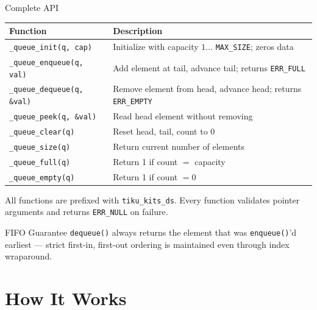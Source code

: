 \documentclass[aspectratio=169, 10pt]{beamer}
\begin{document}
\begin{frame}[fragile]{Complete API}
\begin{table}
\centering
\small
\begin{tabular}{@{}lp{8cm}@{}}
\toprule
\textbf{Function} & \textbf{Description} \\
\midrule
\texttt{\_queue\_init(q, cap)}
  & Initialize with capacity $1 \ldots$ \texttt{MAX\_SIZE}; zeros data \\
\texttt{\_queue\_enqueue(q, val)}
  & Add element at tail, advance tail; returns \texttt{ERR\_FULL} \\
\texttt{\_queue\_dequeue(q, \&val)}
  & Remove element from head, advance head; returns \texttt{ERR\_EMPTY} \\
\texttt{\_queue\_peek(q, \&val)}
  & Read head element without removing \\
\midrule
\texttt{\_queue\_clear(q)}
  & Reset head, tail, count to 0 \\
\texttt{\_queue\_size(q)}
  & Return current number of elements \\
\texttt{\_queue\_full(q)}
  & Return 1 if count $=$ capacity \\
\texttt{\_queue\_empty(q)}
  & Return 1 if count $= 0$ \\
\bottomrule
\end{tabular}
\end{table}

\vspace{0.3em}
{\scriptsize All functions are prefixed with \texttt{tiku\_kits\_ds}.
Every function validates pointer arguments and returns \texttt{ERR\_NULL} on failure.}

\begin{alertblock}{FIFO Guarantee}
\texttt{dequeue()} always returns the element that was \texttt{enqueue()}'d
earliest --- strict first-in, first-out ordering is maintained even through
index wraparound.
\end{alertblock}
\end{frame}

\section{How It Works}
\end{document}
